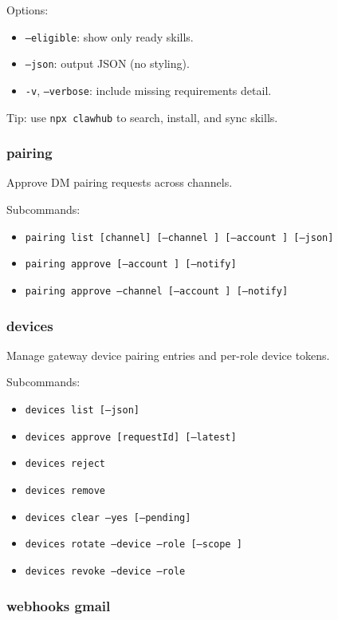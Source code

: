 Options:

\begin{itemize}
  \item \texttt{--eligible}: show only ready skills.
  \item \texttt{--json}: output JSON (no styling).
  \item \texttt{-v}, \texttt{--verbose}: include missing requirements detail.
\end{itemize}


Tip: use \texttt{npx clawhub} to search, install, and sync skills.

\subsubsection{pairing}


Approve DM pairing requests across channels.

Subcommands:

\begin{itemize}
  \item \texttt{pairing list [channel] [--channel ] [--account ] [--json]}
  \item \texttt{pairing approve   [--account ] [--notify]}
  \item \texttt{pairing approve --channel  [--account ]  [--notify]}
\end{itemize}


\subsubsection{devices}


Manage gateway device pairing entries and per-role device tokens.

Subcommands:

\begin{itemize}
  \item \texttt{devices list [--json]}
  \item \texttt{devices approve [requestId] [--latest]}
  \item \texttt{devices reject }
  \item \texttt{devices remove }
  \item \texttt{devices clear --yes [--pending]}
  \item \texttt{devices rotate --device  --role  [--scope ]}
  \item \texttt{devices revoke --device  --role }
\end{itemize}


\subsubsection{webhooks gmail}


